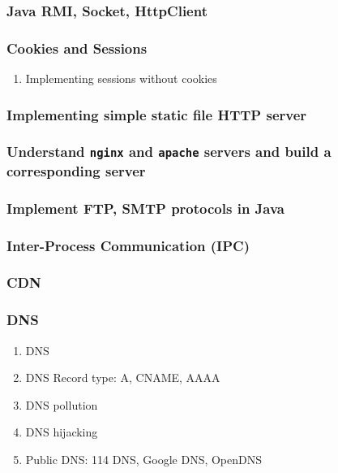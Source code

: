 \documentclass[11pt, twocolumn]{article}
\begin{document}
\subsubsection{Java RMI, Socket, HttpClient}

\subsubsection{Cookies and Sessions}
\begin{enumerate}
	\item Implementing sessions without cookies
\end{enumerate}

\subsubsection{Implementing simple static file HTTP server}

\subsubsection{Understand \texttt{nginx} and \texttt{apache} servers and build a corresponding server}

\subsubsection{Implement FTP, SMTP protocols in Java}

\subsubsection{Inter-Process Communication (IPC)}

\subsubsection{CDN}

\subsubsection{DNS}
\begin{enumerate}
	\item DNS
	\item DNS Record type: A, CNAME, AAAA
	\item DNS pollution
	\item DNS hijacking
	\item Public DNS: 114 DNS, Google DNS, OpenDNS
\end{enumerate}
\end{document}
